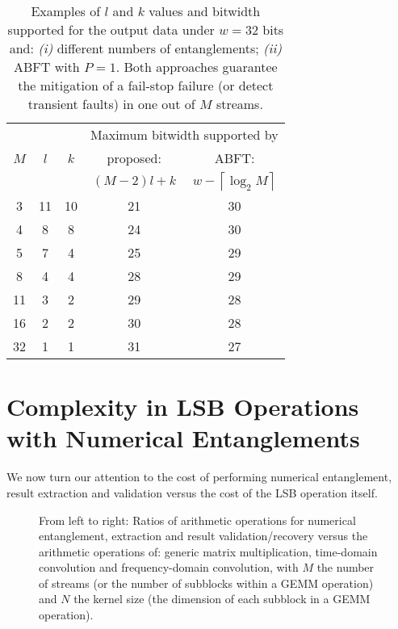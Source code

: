 \documentclass[twocolumn,english,onecolumn]{IEEEtran}
\providecommand{\tabularnewline}{\\}
\theoremstyle{plain}
\theoremstyle{plain}
\begin{document}
\begin{table}[tbh]
\protect\caption{Examples of $l$ and $k$ values and bitwidth supported for the output
data under $w=32$ bits and: \emph{(i)} different numbers of entanglements;
\emph{(ii)} ABFT with $P=1$. Both approaches guarantee the mitigation
of a fail-stop failure (or detect transient faults) in one out of
$M$ streams. \label{tab:Examples_l_k}}


\centering{}\begin{tabular}{|c|c|c|c|c|}
\hline 
\multirow{3}{*}{$M$} & \multirow{3}{*}{$l$} & \multirow{3}{*}{$k$} & \multicolumn{2}{c|}{Maximum bitwidth supported by}\tabularnewline
 &  &  & proposed: & ABFT:\tabularnewline
 &  &  & $\left(M-2\right)l+k$ & $w-\left\lceil \log_{2}M\right\rceil $\tabularnewline
\hline 
3 & 11 & 10 & 21 & 30\tabularnewline
\hline 
4 & 8 & 8 & 24 & 30\tabularnewline
\hline 
5 & 7 & 4 & 25 & 29\tabularnewline
\hline 
8 & 4 & 4 & 28 & 29\tabularnewline
\hline 
11 & 3 & 2 & 29 & 28\tabularnewline
\hline 
16 & 2 & 2 & 30 & 28\tabularnewline
\hline 
32 & 1 & 1 & 31 & 27\tabularnewline
\hline 
\end{tabular}
\end{table}



\section{Complexity in LSB Operations with Numerical Entanglements\label{sec:Linear_processing}}

We now turn our attention to the cost of performing numerical entanglement,
result extraction and validation versus the cost of the LSB operation
itself. 

\begin{figure*}[tbh]
\begin{centering}
\par\end{centering}

\protect\caption{From left to right: Ratios of arithmetic operations for numerical
entanglement, extraction and result validation/recovery versus the
arithmetic operations of: generic matrix multiplication, time-domain
convolution and frequency-domain convolution, with $M$ the number
of streams (or the number of subblocks within a GEMM operation) and
$N$ the kernel size (the dimension of each subblock in a GEMM operation).
\label{fig:Entanglement-cost-vs.GEMM}}
\end{figure*}
\end{document}
